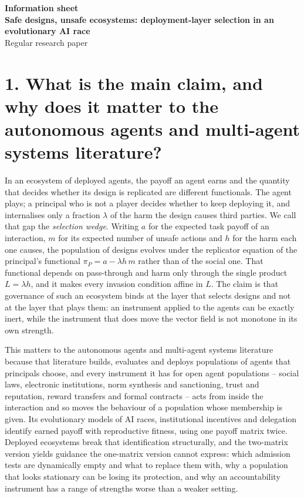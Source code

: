 \documentclass[10pt,a4paper]{article}
\begin{document}
\small                       %

\begin{center}
{\large\bfseries Information sheet}\\[2pt]
{\bfseries Safe designs, unsafe ecosystems: deployment-layer selection in an
evolutionary AI race}\\[2pt]
Regular research paper
\end{center}

\section*{1. What is the main claim, and why does it matter to the autonomous
agents and multi-agent systems literature?}

In an ecosystem of deployed agents, the payoff an agent earns and the quantity
that decides whether its design is replicated are different functionals. The
agent plays; a principal who is not a player decides whether to keep deploying
it, and internalises only a fraction $\lambda$ of the harm the design causes
third parties. We call that gap the \emph{selection wedge}. Writing $a$ for the
expected task payoff of an interaction, $m$ for its expected number of unsafe
actions and $h$ for the harm each one causes, the population of designs evolves
under the replicator equation of the principal's functional
$\pi_{P}=a-\lambda h\,m$ rather than of the social one. That functional depends
on pass-through and harm only through the single product $L=\lambda h$, and it
makes every invasion condition affine in $L$. The claim is that governance of
such an ecosystem binds at the layer that selects designs and not at the layer
that plays them: an instrument applied to the agents can be exactly inert,
while the instrument that does move the vector field is not monotone in its own
strength.

This matters to the autonomous agents and multi-agent systems literature
because that literature builds, evaluates and deploys populations of agents
that principals choose, and every instrument it has for open agent populations
-- social laws, electronic institutions, norm synthesis and sanctioning, trust
and reputation, reward transfers and formal contracts -- acts from inside the
interaction and so moves the behaviour of a population whose membership is
given. Its evolutionary models of AI races, institutional incentives and
delegation identify earned payoff with reproductive fitness, using one payoff
matrix twice. Deployed ecosystems break that identification structurally, and
the two-matrix version yields guidance the one-matrix version cannot express:
which admission tests are dynamically empty and what to replace them with, why
a population that looks stationary can be losing its protection, and why an
accountability instrument has a range of strengths worse than a weaker
setting.
\end{document}
